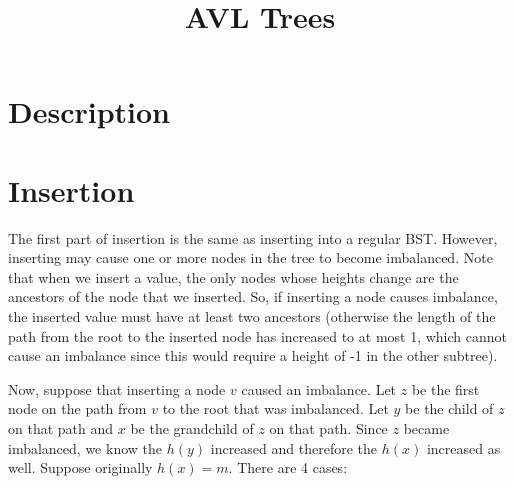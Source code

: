 \documentclass[12pt]{article}
\begin{document}
\title{AVL Trees}
\author{}
\maketitle


\section*{Description}


\section*{Insertion}
The first part of insertion is the same as inserting into a regular BST. However, inserting may cause one or more nodes in the tree to become imbalanced. Note that when we insert a value, the only nodes whose heights change are the ancestors of the node that we inserted. So, if inserting a node causes imbalance, the inserted value must have at least two ancestors (otherwise the length of the path from the root to the inserted node has increased to at most 1, which cannot cause an imbalance since this would require a height of -1 in the other subtree).

Now, suppose that inserting a node $v$ caused an imbalance. Let $z$ be the first node on the path from $v$ to the root that was imbalanced. Let $y$ be the child of $z$ on that path and $x$ be the grandchild of $z$ on that path. Since $z$ became imbalanced, we know the $h(y)$ increased and therefore the $h(x)$ increased as well. Suppose originally $h(x) = m$. There are 4 cases:
\end{document}
